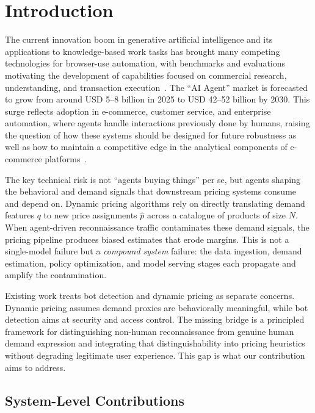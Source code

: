 \documentclass[sigconf]{acmart}
\begin{document}
\section{Introduction}

The current innovation boom in generative artificial intelligence and its applications to knowledge-based work tasks has brought many competing technologies for browser-use automation, with benchmarks and evaluations~\cite{xia_evaluation-driven_2025} motivating the development of capabilities focused on commercial research, understanding, and transaction execution~\cite{xie_osworld_2024}. The ``AI Agent'' market is forecasted to grow from around USD 5--8 billion in 2025 to USD 42--52 billion by 2030. This surge reflects adoption in e-commerce, customer service, and enterprise automation, where agents handle interactions previously done by humans, raising the question of how these systems should be designed for future robustness as well as how to maintain a competitive edge in the analytical components of e-commerce platforms~\cite{markntel_advisors_global_2025}.

The key technical risk is not ``agents buying things'' per se, but agents shaping the behavioral and demand signals that downstream pricing systems consume and depend on. Dynamic pricing algorithms rely on directly translating demand features $q$ to new price assignments $\hat{p}$ across a catalogue of products of size $N$. When agent-driven reconnaissance traffic contaminates these demand signals, the pricing pipeline produces biased estimates that erode margins. This is not a single-model failure but a \textit{compound system} failure: the data ingestion, demand estimation, policy optimization, and model serving stages each propagate and amplify the contamination.

Existing work treats bot detection and dynamic pricing as separate concerns. Dynamic pricing assumes demand proxies are behaviorally meaningful, while bot detection aims at security and access control. The missing bridge is a principled framework for distinguishing non-human reconnaissance from genuine human demand expression and integrating that distinguishability into pricing heuristics without degrading legitimate user experience. This gap is what our contribution aims to address.

\subsection{System-Level Contributions}
\end{document}
